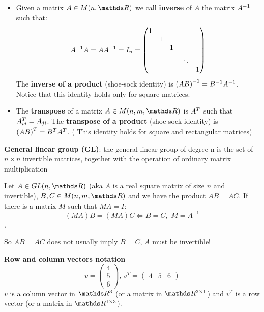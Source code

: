 \documentclass[ComputationalMathematics.tex]{subfiles}
\begin{document}
\begin{itemize}
     \item Given a matrix $A \in M(n, \R)$ we call \textbf{inverse} of $A$ the matrix ${A}^{-1}$ such that:
         $${A}^{-1} A = A {A}^{-1} = I_{n} =
         \begin{pmatrix}
                1\\
                & 1\\
                & & 1\\
                & & & \ddots\\
                & & & & 1
         \end{pmatrix}$$
         The \textbf{inverse of a product} (shoe-sock identity) is ${(A B)}^{-1} = {B}^{-1} {A}^{-1}$. Notice that this identity holds only for square matrices.

     \item The \textbf{transpose} of a matrix $A \in M(n, m, \R)$ is ${A}^{T}$ such that ${A}^{T}_{ij} = A_{ji}$. The \textbf{transpose of a product} (shoe-sock identity) is ${(A B)}^{T} = {B}^{T} {A}^{T}$. ( This identity holds for square and rectangular matrices)

\end{itemize} 

\begin{definition}
  \textbf{General linear group (GL)}: the general linear group of degree n is the set of $n\times n$ invertible matrices, together with the operation of ordinary matrix multiplication
\end{definition}

\begin{proposition}
  Let $A \in GL(n, \R)$ (aka $A$ is a real square matrix of size $n$ and invertible), $B, C \in M(n, m, \R)$ and we have the product $AB = AC$. If there is a matrix $M$ such that $MA = I$: 
  $$(MA)B = (MA)C \Longleftrightarrow B=C, \,\, M = A^{-1}$$.
\end{proposition}
\noindent So $AB = AC$ does not usually imply $B = C$, $A$ must be invertible!\\

\begin{myframe}{\bf Row and column vectors notation}
        $$v =   \begin{pmatrix}
                    4\\
                    5\\
                    6
                \end{pmatrix},\,
          v^T = \begin{pmatrix}
                    4 & 5 & 6
          \end{pmatrix}$$
          $v$ is a column vector in $\R^3$ (or a matrix in $\R^{3 \times 1}$) and $v^T$ is a row vector (or a matrix in $\R^{1\times 3}$).
\end{myframe}
\end{document}
